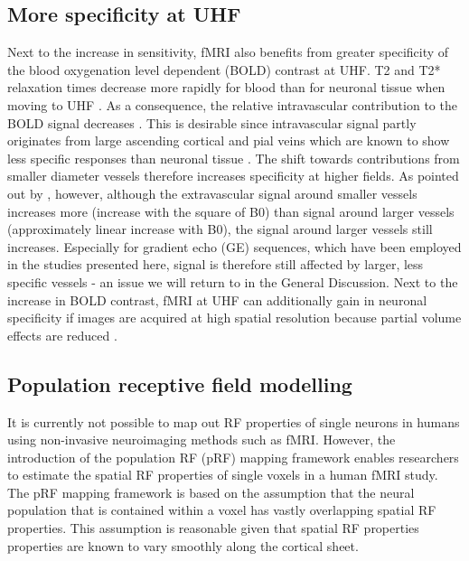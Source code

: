 \subsection{More specificity at UHF}
Next to the increase in sensitivity, fMRI also benefits from greater specificity of the blood oxygenation level dependent (BOLD) contrast at UHF. T2 and T2* relaxation times decrease more rapidly for blood than for neuronal tissue when moving to UHF \parencite{Ugurbil2002}. As a consequence, the relative intravascular contribution to the BOLD signal decreases \parencite{Uludag2009, Uludag2016}. This is desirable since intravascular signal partly originates from large ascending cortical and pial veins which are known to show less specific responses than neuronal tissue \parencite{DeMartino2016, Moerel2017}. The shift towards contributions from smaller diameter vessels therefore increases specificity at higher fields. As pointed out by \cite{DeMartino2016}, however, although the extravascular signal around smaller vessels increases more (increase with the square of B0) than signal around larger vessels (approximately linear increase with B0), the signal around larger vessels still increases. Especially for gradient echo (GE) sequences, which have been employed in the studies presented here, signal is therefore still affected by larger, less specific vessels - an issue we will return to in the General Discussion. Next to the increase in BOLD contrast, fMRI at UHF can additionally gain in neuronal specificity if images are acquired at high spatial resolution because partial volume effects are reduced \parencite{DeMartino2016}.

\subsection{Population receptive field modelling}
It is currently not possible to map out RF properties of single neurons in humans using non-invasive neuroimaging methods such as fMRI. However, the introduction of the population RF (pRF) mapping framework \parencite{Dumoulin2008} enables researchers to estimate the spatial RF properties of single voxels in a human fMRI study. The pRF mapping framework is based on the assumption that the neural population that is contained within a voxel has vastly overlapping spatial RF properties. This assumption is reasonable given that spatial RF properties properties are known to vary smoothly along the cortical sheet.

